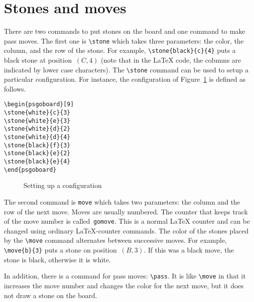 \documentclass[a4paper]{article}
\begin{document}
\section{Stones and moves}

There are two commands to put stones on the board and one command to
make pass moves. The first one is \verb|\stone| which takes three
parameters: the color, the column, and the row of the stone. For
example, \verb|\stone{black}{c}{4}| puts a black stone at
position~$(C,4)$ (note that in the \LaTeX{} code, the columns are
indicated by lower case characters). The \verb|\stone| command can be
used to setup a particular configuration. For instance, the
configuration of Figure~\ref{fig:ko:configuration} is defined as
follows.

\begin{verbatim}
\begin{psgoboard}[9]
\stone{white}{c}{3}
\stone{white}{e}{3}
\stone{white}{d}{2}
\stone{white}{d}{4}
\stone{black}{f}{3}
\stone{black}{e}{2}
\stone{black}{e}{4}
\end{psgoboard}
\end{verbatim}

\begin{figure}
\begin{center}
\begin{psgoboard}[9]
\end{psgoboard}
\caption{Setting up a configuration}
\label{fig:ko:configuration}
\end{center}
\end{figure}


The second command is \verb|move| which takes two parameters: the
column and the row of the next move. Moves are usually numbered. The
counter that keeps track of the move number is
called~\verb|gomove|. This is a normal \LaTeX{} counter and can be
changed using ordinary \LaTeX-counter commands. The color of the
stones placed by the \verb|\move| command alternates between
successive moves. For example, \verb|\move{b}{3}| puts a stone on
position~$(B, 3)$. If this was a black move, the stone is black,
otherwise it is white. 

In addition, there is a command for pass moves: \verb|\pass|. It is
like \verb|\move| in that it increases the move number and changes the
color for the next move, but it does not draw a stone on the board.
\end{document}
